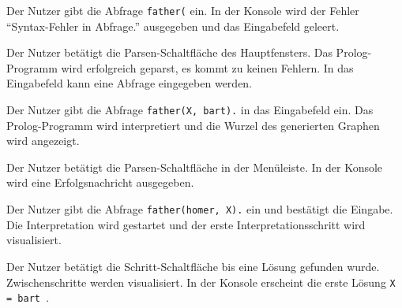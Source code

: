 \documentclass[parskip=full,11pt,twoside]{scrartcl}
\begin{document}
{Der Nutzer gibt die Abfrage \texttt{father(} ein.}
{In der Konsole wird der Fehler \enquote{Syntax-Fehler in Abfrage.} ausgegeben und das Eingabefeld geleert.}

\newpage
{}

{Der Nutzer betätigt die Parsen-Schaltfläche des Hauptfensters.}
{Das Prolog-Programm wird erfolgreich geparst, es kommt zu keinen Fehlern. In das Eingabefeld kann eine Abfrage eingegeben werden.}

{Der Nutzer gibt die Abfrage \texttt{father(X, bart).} in das Eingabefeld ein.}
{Das Prolog-Programm wird interpretiert und die Wurzel des generierten Graphen wird angezeigt.}

\begin{minipage}{\linewidth}
\end{minipage}


{Der Nutzer betätigt die Parsen-Schaltfläche in der Menüleiste.}
{In der Konsole wird eine Erfolgsnachricht ausgegeben.}

{Der Nutzer gibt die Abfrage \texttt{father(homer, X).} ein und bestätigt die Eingabe.}
{Die Interpretation wird gestartet und der erste Interpretationsschritt wird visualisiert.}

{Der Nutzer betätigt die Schritt-Schaltfläche bis eine Lösung gefunden wurde.}
{Zwischenschritte werden visualisiert. In der Konsole erscheint die erste Lösung \texttt{X = bart }.}

\end{document}
